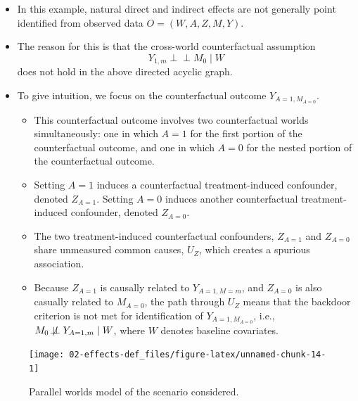 \documentclass[
  12pt,
]{book}
\providecommand{\tightlist}{%
  \setlength{\itemsep}{0pt}\setlength{\parskip}{0pt}}
\theoremstyle{definition}
\theoremstyle{definition}
\theoremstyle{definition}
\newcommand{\indep}{\mbox{$\perp\!\!\!\perp$}}
\newcommand{\1}{\mathbbm{1}}
\begin{document}
\begin{itemize}
\item
  In this example, natural direct and indirect effects are not generally point
  identified from observed data \(O=(W,A,Z,M,Y)\).
\item
  The reason for this is that the cross-world counterfactual
  assumption
  \begin{equation*}
    Y_{1,m}\indep M_0\mid W
  \end{equation*}
  does not hold in the above directed acyclic graph.
\item
  To give intuition, we focus on the counterfactual outcome \(Y_{A=1, M_{A=0}}\).

  \begin{itemize}
  \tightlist
  \item
    This counterfactual outcome involves two counterfactual worlds
    simultaneously: one in which \(A=1\) for the first portion of the
    counterfactual outcome, and one in which \(A=0\) for the nested portion of the
    counterfactual outcome.
  \item
    Setting \(A=1\) induces a counterfactual treatment-induced confounder, denoted
    \(Z_{A=1}\). Setting \(A=0\) induces another counterfactual treatment-induced
    confounder, denoted \(Z_{A=0}\).
  \item
    The two treatment-induced counterfactual confounders, \(Z_{A=1}\) and
    \(Z_{A=0}\) share unmeasured common causes, \(U_Z\), which creates a spurious
    association.
  \item
    Because \(Z_{A=1}\) is causally related to \(Y_{A=1, M=m}\), and \(Z_{A=0}\) is
    also casually related to \(M_{A=0}\), the path through \(U_Z\) means that the
    backdoor criterion is not met for identification of \(Y_{A=1, M_{A=0}}\),
    i.e., \(M_{0} \not\!\perp\!\!\!\perp Y_{A=1, m} \mid W\), where \(W\) denotes
    baseline covariates.
  \end{itemize}
\end{itemize}

\begin{figure}

{\centering \texttt{[image: 02-effects-def\_files/figure-latex/unnamed-chunk-14-1]} 

}

\caption{Parallel worlds model of the scenario considered.}\label{fig:unnamed-chunk-14}
\end{figure}
\end{document}
